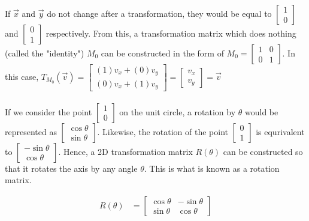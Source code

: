\documentclass[12pt, a4paper]{article}
\begin{document}
If $\vec{x}$ and $\vec{y}$ do not change after a transformation, they would be
equal to $\begin{bmatrix} 1 \\ 0 \end{bmatrix}$ and $\begin{bmatrix} 0 \\ 1
    \end{bmatrix}$ respectively. From this, a transformation matrix which does nothing
(called the "identity") $M_0$ can be constructed in the form of
$
    M_0 = \begin{bmatrix}
        1 & 0 \\
        0 & 1
    \end{bmatrix}
$. In this case, $T_{M_0}(\vec{v}) = \begin{bmatrix}
        (1)v_x + (0)v_y \\
        (0)v_x + (1)v_y
    \end{bmatrix} = \begin{bmatrix}
        v_x \\
        v_y
    \end{bmatrix} = \vec{v}$ \\\\

If we consider the point $\begin{bmatrix} 1 \\ 0 \end{bmatrix}$ on the unit
circle, a rotation by $\theta$ would be represented as $\begin{bmatrix}
        \cos\theta \\ \sin\theta \end{bmatrix}$. Likewise, the rotation of the point
$\begin{bmatrix} 0 \\ 1 \end{bmatrix}$ is equrivalent to $\begin{bmatrix}
        -\sin\theta \\ \cos\theta \end{bmatrix}$. Hence, a 2D transformation matrix
$R(\theta)$ can be constructed so that it rotates the axis by any angle
$\theta$. This is what is known as a rotation matrix.

\begin{align*}
    R(\theta) & = \begin{bmatrix}
                      \cos\theta & -\sin\theta \\
                      \sin\theta & \cos\theta
                  \end{bmatrix}
\end{align*}
\end{document}
